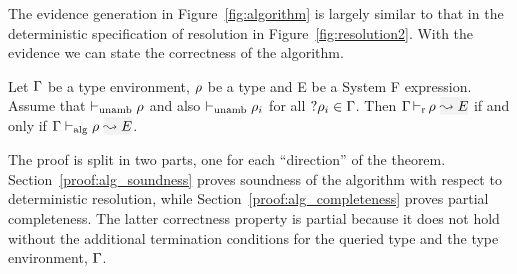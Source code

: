 The evidence generation in Figure~\ref{fig:algorithm} is largely similar to
that in the deterministic specification of resolution in
Figure~\ref{fig:resolution2}.
With the evidence we can state the correctness of the algorithm.

% 

\begin{theorem}
Let $\Gamma$ be a type environment, $\rho$ be a type and E be a System F expression.
Assume that ${ \vdash_{\mathrm{unamb}} \rho}$ and also ${ \vdash_{\mathrm{unamb}} \rho_i}$ for all \(?\rho_i \in \Gamma\).
Then $\dres{\tenv}{\rulet}{E}$ if and only if $\adres{\tenv}{\rulet}{E}$.
\end{theorem}
The proof is split in two parts, one for each ``direction'' of the theorem.
Section~\ref{proof:alg_soundness} proves
soundness of the algorithm with respect to deterministic resolution, while Section~\ref{proof:alg_completeness} proves partial completeness. The latter correctness property is partial because
it does not hold without the additional termination conditions for the queried type and the
type environment, \(\Gamma\).


